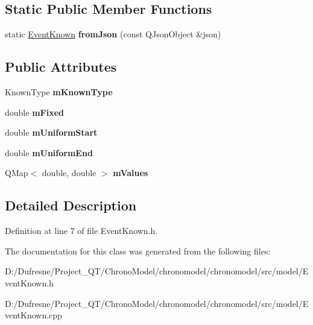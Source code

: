\subsection*{Static Public Member Functions}
\begin{DoxyCompactItemize}
\item 
\hypertarget{class_event_known_a3d71eb1877e9d92976ce3f3976938195}{static \hyperlink{class_event_known}{Event\-Known} {\bfseries from\-Json} (const Q\-Json\-Object \&json)}\label{class_event_known_a3d71eb1877e9d92976ce3f3976938195}

\end{DoxyCompactItemize}
\subsection*{Public Attributes}
\begin{DoxyCompactItemize}
\item 
\hypertarget{class_event_known_ad44f4427101441b35a572450f8636d03}{Known\-Type {\bfseries m\-Known\-Type}}\label{class_event_known_ad44f4427101441b35a572450f8636d03}

\item 
\hypertarget{class_event_known_a821b7711cbd0c88b360d4b7d6f548a21}{double {\bfseries m\-Fixed}}\label{class_event_known_a821b7711cbd0c88b360d4b7d6f548a21}

\item 
\hypertarget{class_event_known_a973aad08bc8a65e479197081f93c85aa}{double {\bfseries m\-Uniform\-Start}}\label{class_event_known_a973aad08bc8a65e479197081f93c85aa}

\item 
\hypertarget{class_event_known_afb8c8381dc8f692f95e2555dc3874756}{double {\bfseries m\-Uniform\-End}}\label{class_event_known_afb8c8381dc8f692f95e2555dc3874756}

\item 
\hypertarget{class_event_known_ae6812da9b710f012109e05164d2af1cf}{Q\-Map$<$ double, double $>$ {\bfseries m\-Values}}\label{class_event_known_ae6812da9b710f012109e05164d2af1cf}

\end{DoxyCompactItemize}


\subsection{Detailed Description}


Definition at line 7 of file Event\-Known.\-h.



The documentation for this class was generated from the following files\-:\begin{DoxyCompactItemize}
\item 
D\-:/\-Dufresne/\-Project\-\_\-\-Q\-T/\-Chrono\-Model/chronomodel/chronomodel/src/model/Event\-Known.\-h\item 
D\-:/\-Dufresne/\-Project\-\_\-\-Q\-T/\-Chrono\-Model/chronomodel/chronomodel/src/model/Event\-Known.\-cpp\end{DoxyCompactItemize}
